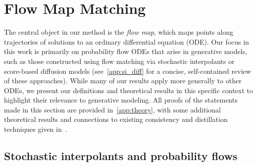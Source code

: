 \section{Flow Map Matching}
\label{sec:theory}

The central object in our method is the \textit{flow map}, which maps points along trajectories of solutions to an ordinary differential equation (ODE).
%
Our focus in this work is primarily on probability flow ODEs that arise in generative models, such as those constructed using flow matching via stochastic interpolants or score-based diffusion models (see~\cref{app:si_diff} for a concise, self-contained review of these approaches).
%
While many of our results apply more generally to other ODEs, we present our definitions and theoretical results in this specific context to highlight their relevance to generative modeling.
%
All proofs of the statements made in this section are provided in~\cref{app:theory}, with some additional theoretical results and connections to existing consistency and distillation techniques given in~.

\subsection{Stochastic interpolants and probability flows}
\label{sec:si:prob:flow}

